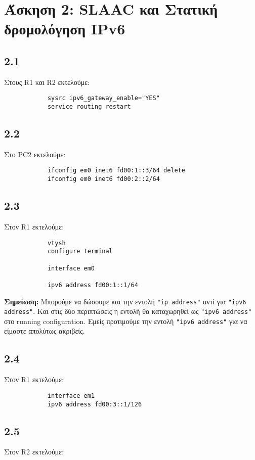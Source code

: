 \documentclass[a4paper, 12pt]{article}
\begin{document}
\section*{Άσκηση 2: SLAAC και Στατική δρομολόγηση IPv6}

	\subsection*{2.1}
		Στους R1 και R2 εκτελούμε:
		
		\begin{verbatim}
			sysrc ipv6_gateway_enable="YES"
			service routing restart
		\end{verbatim} 

	\subsection*{2.2}
		Στο PC2 εκτελούμε:
		
		\begin{verbatim}
			ifconfig em0 inet6 fd00:1::3/64 delete
			ifconfig em0 inet6 fd00:2::2/64
		\end{verbatim}

	\subsection*{2.3}
		Στον R1 εκτελούμε:
		
		\begin{verbatim}
			vtysh
			configure terminal
			
			interface em0
			
			ipv6 address fd00:1::1/64 
		\end{verbatim}
		
		\textbf{Σημείωση:} Μπορούμε να δώσουμε και την εντολή \verb|"ip address"| αντί για \verb|"ipv6 address"|. Και στις δύο περιπτώσεις η εντολή θα καταχωρηθεί ως \verb|"ipv6 address"| στο running configuration. Εμείς προτιμούμε την εντολή \verb|"ipv6 address"| για να είμαστε απολύτως ακριβείς.

	\subsection*{2.4}
		Στον R1 εκτελούμε:
		
		\begin{verbatim}
			interface em1
			ipv6 address fd00:3::1/126
		\end{verbatim}

	\subsection*{2.5}
		Στον R2 εκτελούμε:
		
\end{document}

